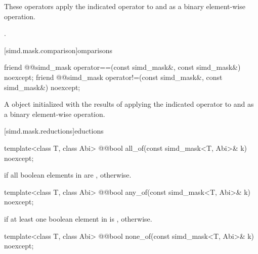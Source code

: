 \begin{itemdescr}
  \pnum\effects
  These operators apply the indicated operator to  and  as a binary element-wise operation.

  \pnum\returns
  .
\end{itemdescr}

[simd.mask.comparison]{\texorpdfstring{omparisons}{simd_mask comparisons}}

\begin{itemdecl}
friend @@simd_mask operator==(const simd_mask&, const simd_mask&) noexcept;
friend @@simd_mask operator!=(const simd_mask&, const simd_mask&) noexcept;
\end{itemdecl}

\begin{itemdescr}
  \pnum\returns
  A  object initialized with the results of applying the indicated operator to  and  as a binary element-wise operation.
\end{itemdescr}

[simd.mask.reductions]{\texorpdfstring{eductions}{simd_mask reductions}}

\begin{itemdecl}
template<class T, class Abi> @@bool all_of(const simd_mask<T, Abi>& k) noexcept;
\end{itemdecl}

\begin{itemdescr}
  \pnum\returns
   if all boolean elements in  are ,  otherwise.
\end{itemdescr}

\begin{itemdecl}
template<class T, class Abi> @@bool any_of(const simd_mask<T, Abi>& k) noexcept;
\end{itemdecl}

\begin{itemdescr}
  \pnum\returns
   if at least one boolean element in  is ,  otherwise.
\end{itemdescr}

\begin{itemdecl}
template<class T, class Abi> @@bool none_of(const simd_mask<T, Abi>& k) noexcept;
\end{itemdecl}


